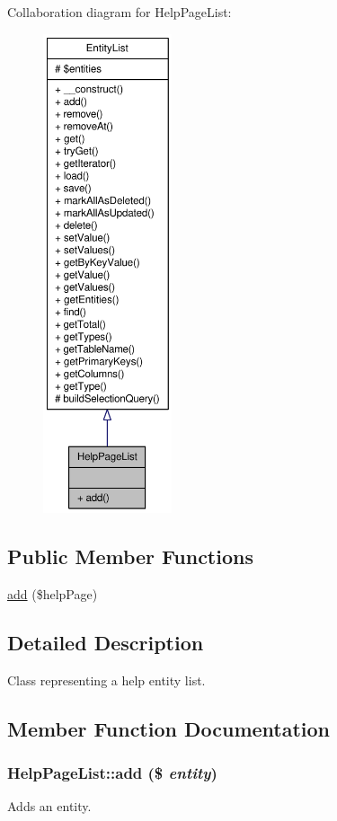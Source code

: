 Collaboration diagram for HelpPageList:\nopagebreak
\begin{figure}[H]
\begin{center}
\leavevmode
\includegraphics[height=400pt]{classHelpPageList__coll__graph}
\end{center}
\end{figure}
\subsection*{Public Member Functions}
\begin{DoxyCompactItemize}
\item 
\hyperlink{classHelpPageList_a62cb7a8510dd50d965e67e9ff97b5f64}{add} (\$helpPage)
\end{DoxyCompactItemize}


\subsection{Detailed Description}
Class representing a help entity list. 

\subsection{Member Function Documentation}
\hypertarget{classHelpPageList_a62cb7a8510dd50d965e67e9ff97b5f64}{
\subsubsection[{add}]{\setlength{\rightskip}{0pt plus 5cm}HelpPageList::add (\$ {\em entity})}}
\label{classHelpPageList_a62cb7a8510dd50d965e67e9ff97b5f64}
Adds an entity.


